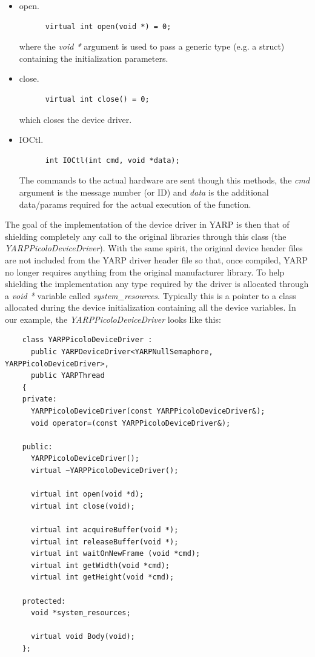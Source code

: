 \begin{itemize}

\item open.
\begin{verbatim}
      virtual int open(void *) = 0;		
\end{verbatim}
where the {\em void *} argument is used to pass a generic type (e.g. a struct) containing the initialization parameters.

\item close.
\begin{verbatim}
      virtual int close() = 0;
\end{verbatim}
which closes the device driver.

\item IOCtl.
\begin{verbatim}
      int IOCtl(int cmd, void *data);
\end{verbatim}
The commands to the actual hardware are sent though this methods, the {\em cmd} argument is the message number (or ID) and {\em data} is the additional data/params required for the actual execution of the function.

\end{itemize}

The goal of the implementation of the device driver in YARP is then
that of shielding completely any call to the original libraries
through this class (the {\em YARPPicoloDeviceDriver}). With the same
spirit, the original device header files are not included from the
YARP driver header file so that, once compiled, YARP no longer
requires anything from the original manufacturer library. To help
shielding the implementation any type required by the driver is
allocated through a {\em void *} variable called {\em
system\_resources}. Typically this is a pointer to a class allocated
during the device initialization containing all the device
variables. In our example, the {\em YARPPicoloDeviceDriver} looks like
this:

\begin{verbatim}
    class YARPPicoloDeviceDriver : 
      public YARPDeviceDriver<YARPNullSemaphore, YARPPicoloDeviceDriver>, 
      public YARPThread
    {
    private:
      YARPPicoloDeviceDriver(const YARPPicoloDeviceDriver&);
      void operator=(const YARPPicoloDeviceDriver&);

    public:
      YARPPicoloDeviceDriver();
      virtual ~YARPPicoloDeviceDriver();

      virtual int open(void *d);
      virtual int close(void);

      virtual int acquireBuffer(void *);
      virtual int releaseBuffer(void *);
      virtual int waitOnNewFrame (void *cmd);
      virtual int getWidth(void *cmd);
      virtual int getHeight(void *cmd);

    protected:
      void *system_resources;

      virtual void Body(void);
    };
\end{verbatim}

